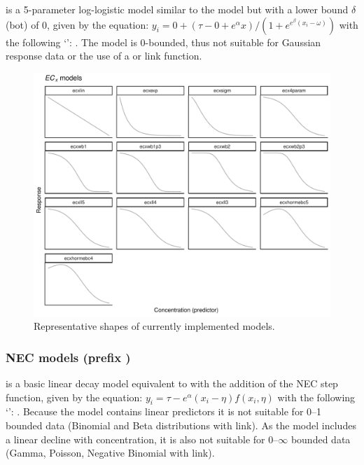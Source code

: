 \documentclass[
  shortnames]{jss}
\newcommand{\cls}[1]{`\code{#1}'}
\begin{document}
 is a 5-parameter log-logistic model similar to the  model but with a lower bound \(\delta\) (bot) of 0, given by the equation:
\(y_i = 0 + (\tau - 0 + e^{\alpha} x)/ (1 + e^{e^{\beta} (x_i - \omega)})\)
with the following \cls{brmsformula}: . The model is 0-bounded, thus not suitable for Gaussian response data or the use of a  or  link function.

\begin{figure}[t!]
  \centering
  \includegraphics[width=1\textwidth]{../vignettes/vignette-fig-exmp2b-theoretical_ecx_curves.pdf}
  \caption{Representative shapes of currently implemented   models.}
  \label{fig1}
\end{figure}

\subsubsection[NEC models (prefix nec)]{NEC models (prefix )}\label{nec-models}

 is a basic linear decay model equivalent to  with the addition of the NEC step function, given by the equation:
\(y_i = \tau - e^{\alpha} \left(x_i - \eta \right) f(x_i, \eta)\)
with the following \cls{brmsformula}: . Because the model contains linear predictors it is not suitable for 0--1 bounded data (Binomial and Beta distributions with  link). As the model includes a linear decline with concentration, it is also not suitable for 0--\(\infty\) bounded data (Gamma, Poisson, Negative Binomial with  link).
\end{document}
